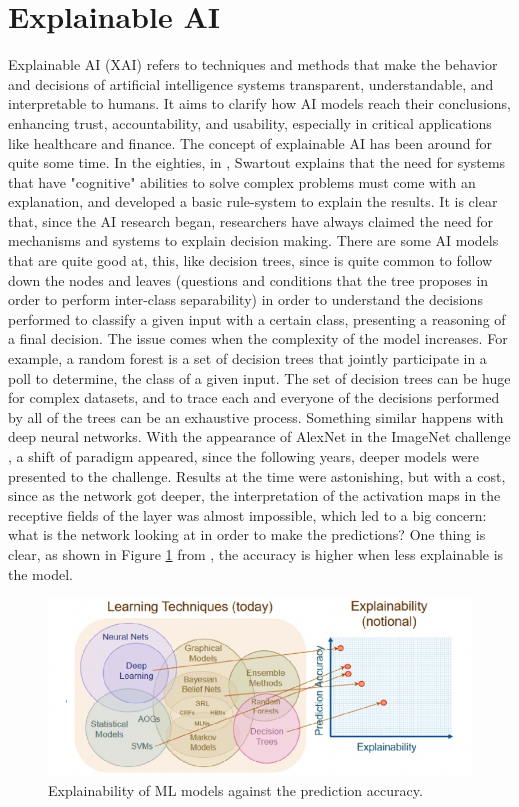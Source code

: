 \section{Explainable AI}
Explainable AI (XAI) refers to techniques and methods that make the behavior and decisions of artificial intelligence systems transparent, understandable, and interpretable to humans. It aims to clarify how AI models reach their conclusions, enhancing trust, accountability, and usability, especially in critical applications like healthcare and finance. The concept of explainable AI has been around for quite some time. In the eighties, in \cite{swartout1985explaining}, Swartout explains that the need for systems that have "cognitive" abilities to solve complex problems must come with an explanation, and developed a basic rule-system to explain the results. It is clear that, since the AI research began, researchers have always claimed the need for mechanisms and systems to explain decision making. There are some AI models that are quite good at, this, like decision trees, since is quite common to follow down the nodes and leaves (questions and conditions that the tree proposes in order to perform inter-class separability) in order to understand the decisions performed to classify a given input with a certain class, presenting a reasoning of a final decision. The issue comes when the complexity of the model increases. For example, a random forest is a set of decision trees that jointly participate in a poll to determine, the class of a given input. The set of decision trees can be huge for complex datasets, and to trace each and everyone of the decisions performed by all of the trees can be an exhaustive process. Something similar happens with deep neural networks. With the appearance of AlexNet \cite{alexNet} in the ImageNet challenge \cite{ILSVRC15}, a shift of paradigm appeared, since the following years, deeper models were presented to the challenge. Results at the time were astonishing, but with a cost, since as the network got deeper, the interpretation of the activation maps in the receptive fields of the layer was almost impossible, which led to a big concern: what is the network looking at in order to make the predictions? One thing is clear, as shown in Figure \ref{fig:explainablechart} from \cite{Turek2017}, the accuracy is higher when less explainable is the model.

\begin{figure}[!h]
	\centering
	\includegraphics[width=0.7\linewidth]{figures/explainable_chart}
	\caption{Explainability of ML models against the prediction accuracy.}
	\label{fig:explainablechart}
\end{figure}


